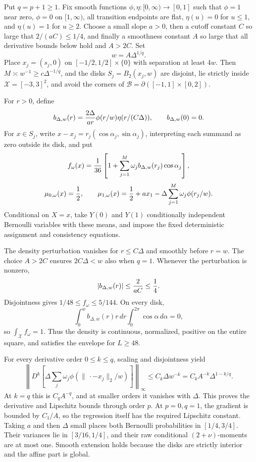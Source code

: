 Put \(q=p+1\geq1\).  Fix smooth functions \(\phi,\eta:[0,\infty)\to[0,1]\) such that \(\phi=1\) near zero, \(\phi=0\) on \([1,\infty)\), all transition endpoints are flat, \(\eta(u)=0\) for \(u\leq1\), and \(\eta(u)=1\) for \(u\geq2\).  Choose a small slope \(a>0\), then a cutoff constant \(C\) so large that \(2/(aC)\leq1/4\), and finally a smoothness constant \(A\) so large that all derivative bounds below hold and \(A>2C\).  Set
\[
 w=A\Delta^{1/q}.
\]
Place \(x_j=(s_j,0)\) on \([-1/2,1/2]\times\{0\}\) with separation at least \(4w\).  Then \(M\asymp w^{-1}\geq c\Delta^{-1/q}\), and the disks \(S_j=B_2(x_j,w)\) are disjoint, lie strictly inside \(\mathcal X=[-3,3]^2\), and avoid the corners of \(\mathcal B=\partial([-1,1]\times[0,2])\).

For \(r>0\), define
\[
 b_{\Delta,w}(r)={2\Delta\over ar}\phi(r/w)\eta(r/(C\Delta)),
 \qquad b_{\Delta,w}(0)=0.
\]
For \(x\in S_j\), write \(x-x_j=r_j(\cos\alpha_j,\sin\alpha_j)\), interpreting each summand as zero outside its disk, and put
\[
 f_\omega(x)={1\over36}\left[1+\sum_{j=1}^M\omega_jb_{\Delta,w}(r_j)\cos\alpha_j\right],
\]
\[
 \mu_{0,\omega}(x)={1\over2},
 \qquad
 \mu_{1,\omega}(x)={1\over2}+ax_1-\Delta\sum_{j=1}^M\omega_j\phi(r_j/w).
\]
Conditional on \(X=x\), take \(Y(0)\) and \(Y(1)\) conditionally independent Bernoulli variables with these means, and impose the fixed deterministic assignment and consistency equations.

The density perturbation vanishes for \(r\leq C\Delta\) and smoothly before \(r=w\).  The choice \(A>2C\) ensures \(2C\Delta<w\) also when \(q=1\).  Whenever the perturbation is nonzero,
\[
 |b_{\Delta,w}(r)|\leq {2\over aC}\leq{1\over4}.
\]
Disjointness gives \(1/48\leq f_\omega\leq5/144\).  On every disk,
\[
 \int_0^w b_{\Delta,w}(r)r\,dr\int_0^{2\pi}\cos\alpha\,d\alpha=0,
\]
so \(\int_{\mathcal X}f_\omega=1\).  Thus the density is continuous, normalized, positive on the entire square, and satisfies the envelope for \(L\geq48\).

For every derivative order \(0\leq k\leq q\), scaling and disjointness yield
\[
 \left\|D^k\left[\Delta\sum_j\omega_j
 \phi(\|\,\cdot-x_j\|_2/w)\right]\right\|_\infty
 \leq C_k\Delta w^{-k}=C_kA^{-k}\Delta^{1-k/q}.
\]
At \(k=q\) this is \(C_qA^{-q}\), and at smaller orders it vanishes with \(\Delta\).  This proves the derivative and Lipschitz bounds through order \(p\).  At \(p=0,q=1\), the gradient is bounded by \(C_1/A\), so the regression itself has the required Lipschitz constant.  Taking \(a\) and then \(\Delta\) small places both Bernoulli probabilities in \([1/4,3/4]\).  Their variances lie in \([3/16,1/4]\), and their raw conditional \((2+\nu)\)-moments are at most one.  Smooth extension holds because the disks are strictly interior and the affine part is global.

